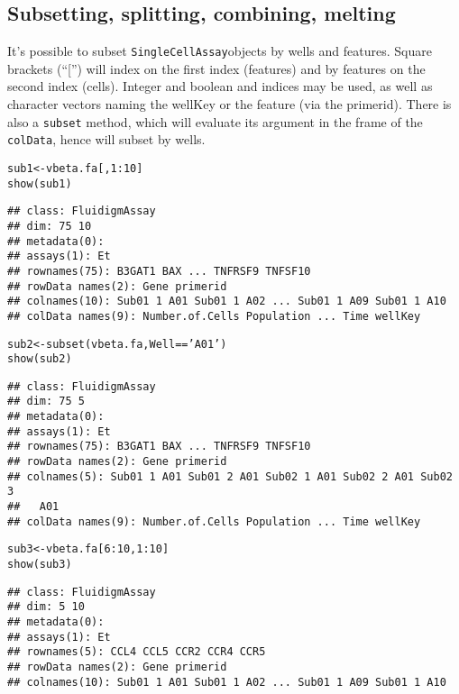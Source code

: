 \documentclass{article}\usepackage[]{graphicx}\usepackage[usenames,dvipsnames]{color}
\newcommand{\hlnum}[1]{\textcolor[rgb]{0.816,0.125,0.439}{#1}}%
\newcommand{\hlstr}[1]{\textcolor[rgb]{0.251,0.627,0.251}{#1}}%
\newcommand{\hlopt}[1]{\textcolor[rgb]{0,0,0}{#1}}%
\newcommand{\hlstd}[1]{\textcolor[rgb]{0.251,0.251,0.251}{#1}}%
\newcommand{\hlkwb}[1]{\textcolor[rgb]{0,0,0}{#1}}%
\newcommand{\hlkwd}[1]{\textcolor[rgb]{0.878,0.439,0.125}{#1}}%
\newenvironment{knitrout}{}{} %
\newcommand{\sca}{\texttt{SingleCellAssay}}
\begin{document}
\subsection{Subsetting, splitting, combining, melting}
It's possible to subset \sca objects by wells and features.
Square brackets (``['') will index on
the first index (features) and by features on the second index (cells).
Integer and boolean and indices may be used, as well as character vectors
naming the wellKey or the feature (via the primerid).
There is also a \texttt{subset} method, which will evaluate its argument in the frame of the \texttt{colData}, hence will subset by wells.
\begin{knitrout}
\color{fgcolor}\begin{kframe}
\begin{alltt}
\hlstd{sub1} \hlkwb{<-} \hlstd{vbeta.fa[,}\hlnum{1}\hlopt{:}\hlnum{10}\hlstd{]}
\hlkwd{show}\hlstd{(sub1)}
\end{alltt}
\begin{verbatim}
## class: FluidigmAssay 
## dim: 75 10 
## metadata(0):
## assays(1): Et
## rownames(75): B3GAT1 BAX ... TNFRSF9 TNFSF10
## rowData names(2): Gene primerid
## colnames(10): Sub01 1 A01 Sub01 1 A02 ... Sub01 1 A09 Sub01 1 A10
## colData names(9): Number.of.Cells Population ... Time wellKey
\end{verbatim}
\begin{alltt}
\hlstd{sub2} \hlkwb{<-} \hlkwd{subset}\hlstd{(vbeta.fa, Well}\hlopt{==}\hlstr{'A01'}\hlstd{)}
\hlkwd{show}\hlstd{(sub2)}
\end{alltt}
\begin{verbatim}
## class: FluidigmAssay 
## dim: 75 5 
## metadata(0):
## assays(1): Et
## rownames(75): B3GAT1 BAX ... TNFRSF9 TNFSF10
## rowData names(2): Gene primerid
## colnames(5): Sub01 1 A01 Sub01 2 A01 Sub02 1 A01 Sub02 2 A01 Sub02 3
##   A01
## colData names(9): Number.of.Cells Population ... Time wellKey
\end{verbatim}
\begin{alltt}
\hlstd{sub3} \hlkwb{<-} \hlstd{vbeta.fa[}\hlnum{6}\hlopt{:}\hlnum{10}\hlstd{,} \hlnum{1}\hlopt{:}\hlnum{10}\hlstd{]}
\hlkwd{show}\hlstd{(sub3)}
\end{alltt}
\begin{verbatim}
## class: FluidigmAssay 
## dim: 5 10 
## metadata(0):
## assays(1): Et
## rownames(5): CCL4 CCL5 CCR2 CCR4 CCR5
## rowData names(2): Gene primerid
## colnames(10): Sub01 1 A01 Sub01 1 A02 ... Sub01 1 A09 Sub01 1 A10

\end{verbatim}
\end{kframe}
\end{knitrout}
\end{document}
